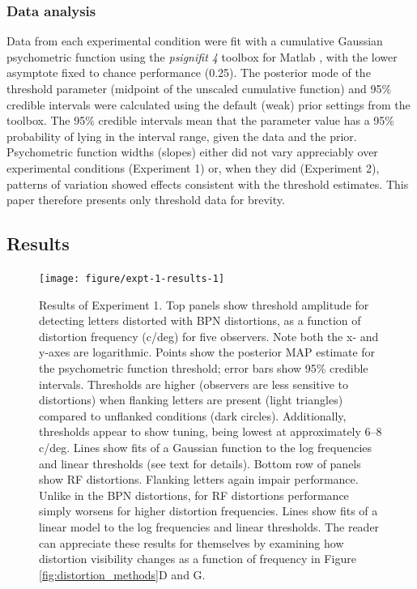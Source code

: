 \documentclass[doc, 11pt,a4paper,natbib]{apa6}\usepackage[]{graphicx}\usepackage[]{color}
\newenvironment{knitrout}{}{} %
\begin{document}
\subsubsection{Data analysis}

Data from each experimental condition were fit with a cumulative Gaussian psychometric function using the \textit{psignifit 4} toolbox for Matlab \citep{schutt_painfree_2016}, with the lower asymptote fixed to chance performance (0.25).
The posterior mode of the threshold parameter (midpoint of the unscaled cumulative function) and 95\% credible intervals were calculated using the default (weak) prior settings from the toolbox.
The 95\% credible intervals mean that the parameter value has a 95\% probability of lying in the interval range, given the data and the prior.
Psychometric function widths (slopes) either did not vary appreciably over experimental conditions (Experiment 1) or, when they did (Experiment 2), patterns of variation showed effects consistent with the threshold estimates.
This paper therefore presents only threshold data for brevity.


\subsection{Results}









\begin{knitrout}
\color{fgcolor}\begin{figure}
\texttt{[image: figure/expt-1-results-1]} \caption{Results of Experiment 1.
              Top panels show threshold amplitude for detecting letters distorted with BPN distortions, as a function of distortion frequency (c/deg) for five observers.
	Note both the x- and y-axes are logarithmic.
	Points show the posterior MAP estimate for the psychometric function threshold; error bars show 95\% credible intervals.
	Thresholds are higher (observers are less sensitive to distortions) when flanking letters are present (light triangles) compared to unflanked conditions (dark circles).
	Additionally, thresholds appear to show tuning, being lowest at approximately 6--8 c/deg.
	Lines show fits of a Gaussian function to the log frequencies and linear thresholds (see text for details).
 Bottom row of panels show RF distortions.
	Flanking letters again impair performance.
	Unlike in the BPN distortions, for RF distortions performance simply worsens for higher distortion frequencies.
  Lines show fits of a linear model to the log frequencies and linear thresholds.
	The reader can appreciate these results for themselves by examining how distortion visibility changes as a function of frequency in Figure \ref{fig:distortion_methods}D and G.
              }\label{fig:expt-1-results}
\end{figure}


\end{knitrout}
\end{document}

